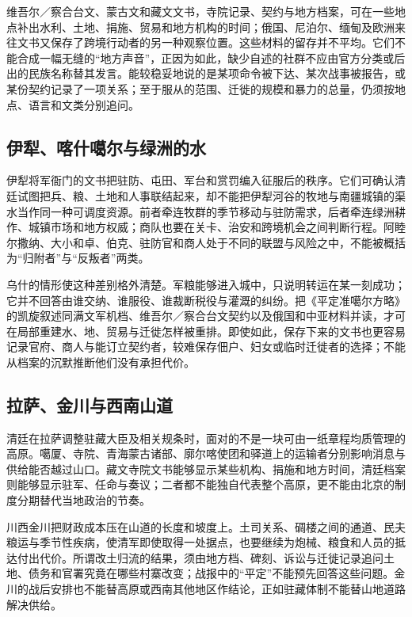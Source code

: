维吾尔／察合台文、蒙古文和藏文文书，寺院记录、契约与地方档案，可在一些地点补出水利、土地、捐施、贸易和地方机构的时间；俄国、尼泊尔、缅甸及欧洲来往文书又保存了跨境行动者的另一种观察位置。这些材料的留存并不平均。它们不能合成一幅无缝的“地方声音”，正因为如此，缺少自述的社群不应由官方分类或后出的民族名称替其发言。能较稳妥地说的是某项命令被下达、某次战事被报告，或某份契约记录了一项关系；至于服从的范围、迁徙的规模和暴力的总量，仍须按地点、语言和文类分别追问。

\subsection{伊犁、喀什噶尔与绿洲的水}

伊犁将军衙门的文书把驻防、屯田、军台和赏罚编入征服后的秩序。它们可确认清廷试图把兵、粮、土地和人事联结起来，却不能把伊犁河谷的牧地与南疆城镇的渠水当作同一种可调度资源。前者牵连牧群的季节移动与驻防需求，后者牵连绿洲耕作、城镇市场和地方权威；商队也要在关卡、治安和跨境机会之间判断行程。阿睦尔撒纳、大小和卓、伯克、驻防官和商人处于不同的联盟与风险之中，不能被概括为“归附者”与“反叛者”两类。

乌什的情形使这种差别格外清楚。军粮能够进入城中，只说明转运在某一刻成功；它并不回答由谁交纳、谁服役、谁裁断税役与灌溉的纠纷。把《平定准噶尔方略》的凯旋叙述同满文军机档、维吾尔／察合台文契约以及俄国和中亚材料并读，才可在局部重建水、地、贸易与迁徙怎样被重排。即使如此，保存下来的文书也更容易记录官府、商人与能订立契约者，较难保存佃户、妇女或临时迁徙者的选择；不能从档案的沉默推断他们没有承担代价。

\subsection{拉萨、金川与西南山道}

清廷在拉萨调整驻藏大臣及相关规条时，面对的不是一块可由一纸章程均质管理的高原。噶厦、寺院、青海蒙古诸部、廓尔喀使团和驿道上的运输者分别影响消息与供给能否越过山口。藏文寺院文书能够显示某些机构、捐施和地方时间，清廷档案则能够显示驻军、任命与奏议；二者都不能独自代表整个高原，更不能由北京的制度分期替代当地政治的节奏。

川西金川把财政成本压在山道的长度和坡度上。土司关系、碉楼之间的通道、民夫粮运与季节性疾病，使清军即使取得一处据点，也要继续为炮械、粮食和人员的抵达付出代价。所谓改土归流的结果，须由地方档、碑刻、诉讼与迁徙记录追问土地、债务和官署究竟在哪些村寨改变；战报中的“平定”不能预先回答这些问题。金川的战后安排也不能替高原或西南其他地区作结论，正如驻藏体制不能替山地道路解决供给。

